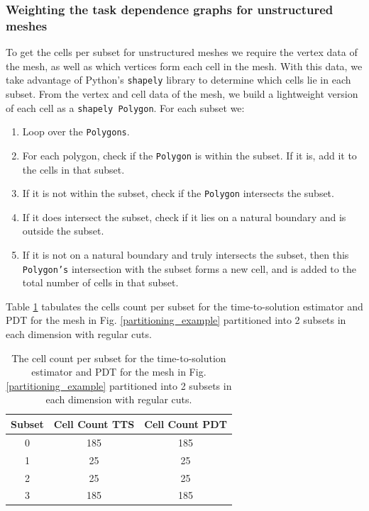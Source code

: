 \subsubsection{Weighting the task dependence graphs for unstructured meshes}
To get the cells per subset for unstructured meshes we require the vertex data of the mesh, as well as which vertices form each cell in the mesh.
With this data, we take advantage of Python's {\tt shapely} library to determine which cells lie in each subset. From the vertex and cell data of the mesh, we build a lightweight version of each cell as a {\tt shapely Polygon}.
For each subset we:
\begin{enumerate}
  \item Loop over the {\tt Polygons}.
  \item For each polygon, check if the {\tt Polygon} is within the subset. If it is, add it to the cells in that subset.
  \item If it is not within the subset, check if the {\tt Polygon} intersects the subset.
  \item If it does intersect the subset, check if it lies on a natural boundary and is outside the subset.
  \item If it is not on a natural boundary and truly intersects the subset, then this {\tt Polygon's} intersection with the subset forms a new cell,  and is added to the total number of cells in that subset.
\end{enumerate}
Table \ref{2x2_cellcount} tabulates the cells count per subset for the time-to-solution estimator and PDT for the mesh in Fig. \ref{partitioning_example} partitioned into 2 subsets in each dimension with regular cuts. 
\begin{table}[H]
\centering
\caption{The cell count per subset for the time-to-solution estimator and PDT for the mesh in Fig. \ref{partitioning_example} partitioned into 2 subsets in each dimension with regular cuts.}
\label{2x2_cellcount}
\begin{tabular}{c|c|c}
\textbf{Subset} & \textbf{Cell Count TTS} & \textbf{Cell Count PDT} \\ \hline
0 & 185 & 185 \\ \hline
1 & 25 & 25 \\ \hline
2 & 25 & 25 \\ \hline
3 & 185 & 185
\end{tabular}
\end{table}

